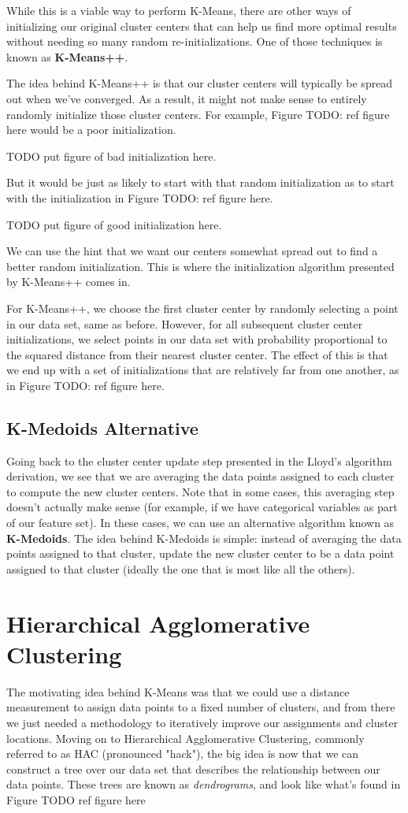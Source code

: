 While this is a viable way to perform K-Means, there are other ways of initializing our original cluster centers that can help us find more optimal results without needing so many random re-initializations. One of those techniques is known as \textbf{K-Means++}.

The idea behind K-Means++ is that our cluster centers will typically be spread out when we've converged. As a result, it might not make sense to entirely randomly initialize those cluster centers. For example, Figure TODO: ref figure here would be a poor initialization.

TODO put figure of bad initialization here.

But it would be just as likely to start with that random initialization as to start with the initialization in Figure TODO: ref figure here.

TODO put figure of good initialization here.

We can use the hint that we want our centers somewhat spread out to find a better random initialization. This is where the initialization algorithm presented by K-Means++ comes in.

For K-Means++, we choose the first cluster center by randomly selecting a point in our data set, same as before. However, for all subsequent cluster center initializations, we select points in our data set with probability proportional to the squared distance from their nearest cluster center. The effect of this is that we end up with a set of initializations that are relatively far from one another, as in Figure TODO: ref figure here.

\subsection{K-Medoids Alternative}
Going back to the cluster center update step presented in the Lloyd's algorithm derivation, we see that we are averaging the data points assigned to each cluster to compute the new cluster centers. Note that in some cases, this averaging step doesn't actually make sense (for example, if we have categorical variables as part of our feature set). In these cases, we can use an alternative algorithm known as \textbf{K-Medoids}. The idea behind K-Medoids is simple: instead of averaging the data points assigned to that cluster, update the new cluster center to be a data point assigned to that cluster (ideally the one that is most like all the others).

\section{Hierarchical Agglomerative Clustering}
The motivating idea behind K-Means was that we could use a distance measurement to assign data points to a fixed number of clusters, and from there we just needed a methodology to iteratively improve our assignments and cluster locations. Moving on to Hierarchical Agglomerative Clustering, commonly referred to as HAC (pronounced "hack"), the big idea is now that we can construct a tree over our data set that describes the relationship between our data points. These trees are known as \textit{dendrograms}, and look like what's found in Figure TODO ref figure here

